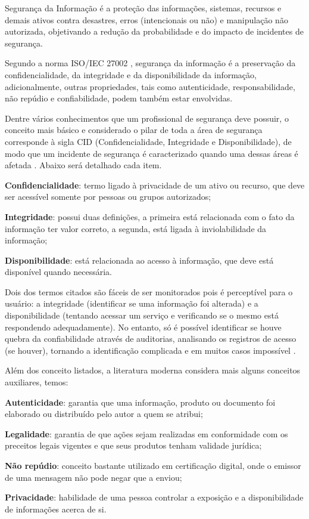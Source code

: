 Segurança da Informação é a proteção das informações, sistemas, recursos e demais ativos contra desastres, erros (intencionais ou não) e manipulação não autorizada, objetivando a redução da probabilidade e do impacto de incidentes de segurança.

Segundo a norma ISO/IEC 27002 \cite{isoiec27002}, segurança da informação é a preservação da confidencialidade, da integridade e da disponibilidade da informação, adicionalmente, outras propriedades, tais como autenticidade, responsabilidade, não repúdio e confiabilidade, podem também estar envolvidas.

Dentre vários conhecimentos que um profissional de segurança deve possuir, o conceito mais básico e considerado o pilar de toda a área de segurança corresponde à sigla CID (Confidencialidade, Integridade e Disponibilidade), de modo que um incidente de segurança é caracterizado quando uma dessas áreas é afetada \cite{seg-redes-sistemas}. Abaixo será detalhado cada item.

\begin{alineas}
 \item \textbf{Confidencialidade}: termo ligado à privacidade de um ativo ou recurso, que deve ser acessível somente por pessoas ou grupos autorizados;
 \item \textbf{Integridade}: possui duas definições, a primeira está relacionada com o fato da informação ter valor correto, a segunda, está ligada à inviolabilidade da informação;
 \item \textbf{Disponibilidade}: está relacionada ao acesso à informação, que deve está disponível quando necessária.
\end{alineas}

Dois dos termos citados são fáceis de ser monitorados pois é perceptível para o usuário: a integridade (identificar se uma informação foi alterada) e a disponibilidade (tentando acessar um serviço e verificando se o mesmo está respondendo adequadamente). No entanto, só é possível identificar se houve quebra da confiabilidade através de auditorias, analisando os registros de acesso (se houver), tornando a identificação complicada e em muitos casos impossível \cite{seg-redes-sistemas}.

Além dos conceito listados, a literatura moderna considera mais alguns conceitos auxiliares, temos:

\begin{alineas}
 \item \textbf{Autenticidade}: garantia que uma informação, produto ou documento foi elaborado ou distribuído pelo autor a quem se atribui;
 \item \textbf{Legalidade}: garantia de que ações sejam realizadas em conformidade com os preceitos legais vigentes e que seus produtos tenham validade jurídica;
 \item \textbf{Não repúdio}: conceito bastante utilizado em certificação digital, onde o emissor de uma mensagem não pode negar que a enviou;
 \item \textbf{Privacidade}: habilidade de uma pessoa controlar a exposição e a disponibilidade de informações acerca de si.
\end{alineas}

